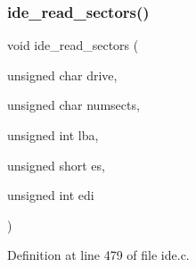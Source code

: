 \subsubsection{\texorpdfstring{ide\+\_\+read\+\_\+sectors()}{ide\_read\_sectors()}}
{\footnotesize\ttfamily void ide\+\_\+read\+\_\+sectors (\begin{DoxyParamCaption}\item[{unsigned char}]{drive,  }\item[{unsigned char}]{numsects,  }\item[{unsigned int}]{lba,  }\item[{unsigned short}]{es,  }\item[{unsigned int}]{edi }\end{DoxyParamCaption})}



Definition at line 479 of file ide.\+c.


